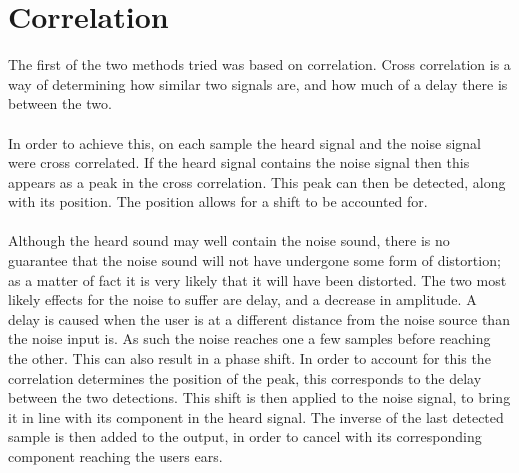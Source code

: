 \section{Correlation}

The first of the two methods tried was based on correlation.
Cross correlation is a way of determining how similar two signals are, and how much of a delay there is between the two.
\\
\\
In order to achieve this, on each sample the heard signal and the noise signal were cross correlated.
If the heard signal contains the noise signal then this appears as a peak in the cross correlation.
This peak can then be detected, along with its position.
The position allows for a shift to be accounted for.
\\
\\
Although the heard sound may well contain the noise sound, there is no guarantee that the noise sound will not have undergone some form of distortion; as a matter of fact it is very likely that it will have been distorted.
The two most likely effects for the noise to suffer are delay, and a decrease in amplitude.
A delay is caused when the user is at a different distance from the noise source than the noise input is.
As such the noise reaches one a few samples before reaching the other.
This can also result in a phase shift.
In order to account for this the correlation determines the position of the peak, this corresponds to the delay between the two detections.
This shift is then applied to the noise signal, to bring it in line with its component in the heard signal.
The inverse of the last detected sample is then added to the output, in order to cancel with its corresponding component reaching the users ears.
